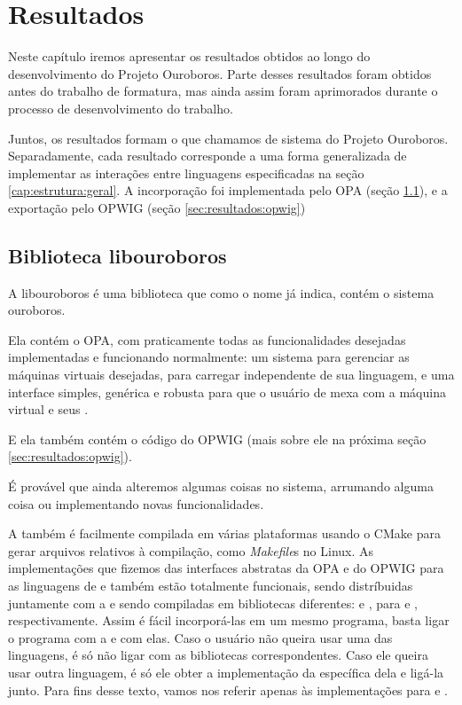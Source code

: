 \chapter{Resultados}
\label{sec:resultados}

Neste capítulo iremos apresentar os resultados obtidos ao longo do
desenvolvimento do Projeto Ouroboros. Parte desses resultados foram
obtidos antes do trabalho de formatura, mas ainda assim foram aprimorados
durante o processo de desenvolvimento do trabalho.

Juntos, os resultados formam o que chamamos de sistema do Projeto Ouroboros.
Separadamente, cada resultado corresponde a uma forma generalizada de implementar
as interações entre linguagens especificadas na seção \ref{cap:estrutura:geral}.
A incorporação foi implementada pelo OPA (seção \ref{sec:resultados:libouroboros}),
e a exportação pelo OPWIG (seção \ref{sec:resultados:opwig})


\section{Biblioteca \textbf{libouroboros}}
\label{sec:resultados:libouroboros}
A libouroboros é uma biblioteca \CXX{} que como o nome já indica, contém
o sistema ouroboros.

Ela contém o OPA, com praticamente todas as funcionalidades desejadas 
implementadas e funcionando normalmente: um sistema para gerenciar as máquinas
virtuais desejadas, para carregar  independente de sua
linguagem, e uma interface simples, genérica e robusta para
que o usuário de \CXX{} mexa com a máquina virtual e seus .

E ela também contém o código do OPWIG (mais sobre ele na próxima seção
\ref{sec:resultados:opwig}).

É provável que ainda alteremos algumas coisas no sistema, arrumando alguma
coisa ou implementando novas funcionalidades.

A  também é facilmente compilada em várias plataformas usando
o CMake para gerar arquivos relativos à compilação, como \textit{Makefile}s
no Linux. As implementações que fizemos das interfaces abstratas da OPA e do 
OPWIG para as linguagens de \script{}  e  também estão totalmente funcionais,
sendo distríbuidas juntamente com a  e sendo compiladas em
bibliotecas diferentes:  e ,
para  e , respectivamente. Assim é fácil incorporá-las em um
mesmo programa, basta ligar o programa com a  e com elas. 
Caso o usuário não queira usar uma das linguagens, é só não ligar com 
as bibliotecas correspondentes. Caso ele queira usar outra linguagem, é
só ele obter a implementação da  específica dela e ligá-la junto.
Para fins desse texto, vamos nos referir apenas às implementações para
 e .

